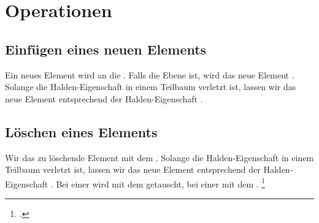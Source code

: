 \documentclass{bschlangaul-theorie}
\begin{document}
\begin{center}
\end{center}

%

\section{Operationen}

%

\subsection{Einfügen eines neuen Elements}

Ein neues Element wird an die . Falls die Ebene  ist, wird das
neue Element . Solange die
Halden-Eigenschaft in einem Teilbaum verletzt ist, lassen wir das neue
Element entsprechend der Halden-Eigenschaft .

%

\subsection{Löschen eines Elements}

Wir  das zu löschende Element mit dem .
%
Solange die Halden-Eigenschaft in einem Teilbaum verletzt ist, lassen
wir das neue Element entsprechend der Halden-Eigenschaft .
%
Bei einer  wird mit dem 
getauscht, bei einer  mit dem .
\footcite[Seite 28]{aud:fs:tafeluebung-11}



\literatur
\end{document}
